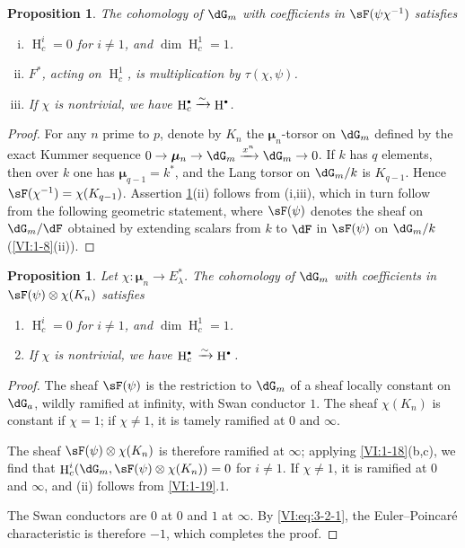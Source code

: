 \documentclass[oneside]{book}
\DeclareMathOperator{\h}{H}
\newcommand{\dmu}{{\bm\mu}}
\newcounter{char}
\newcommand{\iso}{\xrightarrow\sim}
\theoremstyle{sga-source}
\theoremstyle{sga-source-dash}
\theoremstyle{sga-source-dotdash}
\theoremstyle{sga-source-number-note-dash}
\theoremstyle{sga-source-note-number-dotdash}
\theoremstyle{sga-source-example-dotdash}
\theoremstyle{sga-source-inline-number}
\theoremstyle{sga-source-bare-number}
\theoremstyle{sga-source}
\newtheorem{proposition_}[subsection]{Proposition}
\let\oldbullet\bullet
\renewcommand{\bullet}{\textnormal{\tiny$\oldbullet$}}
\newcommand{\PrintPage}[1]{}\newcommand{\MathPage}[1]{}\newcommand{\PrintCite}[2]{#1}\newcommand{\var}[3]{#2}
\begin{document}
\begin{proposition_}\label{VI:4-2}
The cohomology of $\dG_m$ with coefficients in $\sF(\psi\chi^{-1})$ satisfies 
\begin{enumerate}[(i)]
  \item $\h_c^i=0$ for $i\ne 1$, and $\dim \h_c^1=1$. 
  \item $F^\ast$, acting on $\h_c^1$, is multiplication by 
    $\tau(\chi,\psi)$. 
  \item If $\chi$ is nontrivial, we have $\h_c^\bullet \iso \h^\bullet$. 
\end{enumerate}
\end{proposition_}
\begin{proof}[Proof]
For any $n$ prime to $p$, denote by $K_n$ the $\dmu_n$-torsor on $\dG_m$ 
defined by the exact Kummer sequence 
$0 \to \dmu_n \to \dG_m \xrightarrow{x^n} \dG_m \to 0$. If $k$ has $q$ 
elements, then over $k$ one has $\dmu_{q-1}=k^\ast$, and the Lang torsor on 
$\dG_m/k$ is $K_{q-1}$. Hence $\sF(\chi^{-1})=\chi(K_{q-1})$. 
Assertion \ref{VI:4-2}(ii) follows from (i,iii), which in turn follow from 
the following geometric statement, where $\sF(\psi)$ denotes the sheaf 
on $\dG_m/\dF$ obtained by extending scalars from $k$ to $\dF$ in 
$\sF(\psi)$ on $\dG_m/k$ (\ref{VI:1-8}(ii)). 
\end{proof}





\begin{proposition_}\label{VI:4-3}
Let $\chi:\dmu_n \to E_\lambda^\ast$. The cohomology of $\dG_m$ with 
coefficients in $\sF(\psi)\otimes \chi(K_n)$ satisfies 
\begin{enumerate}[\indent (i)]
  \item $\h_c^i=0$ for $i\ne 1$, and $\dim \h_c^1{} = 1$. 
  \item If $\chi$ is nontrivial, we have $\h_c^\bullet{}\iso \h^\bullet{}$. 
\end{enumerate}
\end{proposition_}
\PrintPage{197}
\begin{proof}[Proof]
The sheaf $\sF(\psi)$ is the restriction to $\dG_m$ of a sheaf locally 
constant on $\dG_a$, wildly ramified at infinity, with Swan conductor 
$1$. The sheaf $\chi(K_n)$ is constant if $\chi=1$; if $\chi\ne 1$, it 
is tamely ramified at $0$ and $\infty$. 

The sheaf $\sF(\psi)\otimes\chi(K_n)$ is therefore ramified at $\infty$; 
applying \ref{VI:1-18}(b,c), we find that 
$\h_c^i(\dG_m,\sF(\psi)\otimes \chi(K_n))=0$ for $i\ne 1$. If $\chi\ne 1$, it 
is ramified at $0$ and $\infty$, and (ii) follows from \ref{VI:1-19}.1. 

The Swan conductors are $0$ at $0$ and $1$ at $\infty$. By 
\eqref{VI:eq:3-2-1}, the Euler--Poincaré characteristic is therefore $-1$, 
which completes the proof. 
\end{proof}
\end{document}
